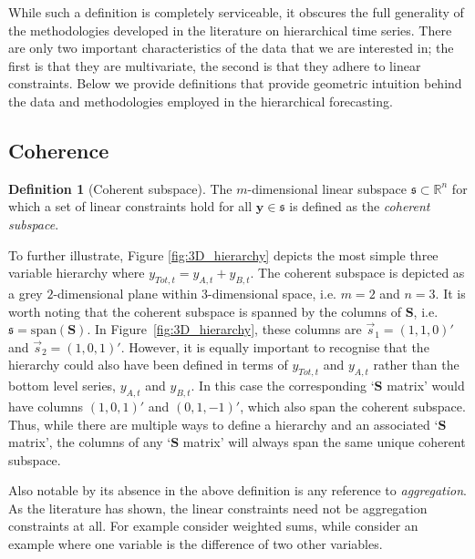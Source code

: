 \documentclass[12pt]{article}
\theoremstyle{definition}
\newtheorem{definition}{Definition}[section]
\begin{document}
	While such a definition is completely serviceable, it obscures the full generality of the methodologies developed in the literature on hierarchical time series.  There are only two important characteristics of the data that we are interested in; the first is that they are multivariate, the second is that they adhere to linear constraints.  Below we provide definitions that provide geometric intuition behind the data and methodologies employed in the hierarchical forecasting.
	
	
	\subsection{Coherence}\label{sec:cohpointf}
	
	 \begin{definition}[Coherent subspace]\label{def:cohspace}
	 	The $m$-dimensional linear subspace $\mathfrak{s}\subset \mathbb{R}^n$ for which a set of linear constraints hold for all $\bm{y}\in\mathfrak{s}$ is defined as the \emph{coherent subspace}.
	 \end{definition}
 
     To further illustrate, Figure \ref{fig:3D_hierarchy} depicts the most simple three variable hierarchy where $y_{Tot,t}=y_{A,t}+y_{B,t}$.  The coherent subspace is depicted as a grey $2$-dimensional plane within $3$-dimensional space, i.e. $m=2$ and $n=3$.  It is worth noting that the coherent subspace is spanned by the columns of $\bm{S}$, i.e.\ $\mathfrak{s}=\text{span}(\bm{S})$.  In Figure~\ref{fig:3D_hierarchy}, these columns are $\vec{s}_1=(1,1,0)'$ and $\vec{s}_2=(1,0,1)'$.  However, it is equally important to recognise that the hierarchy could also have been defined in terms of $y_{Tot,t}$ and $y_{A,t}$ rather than the bottom level series, $y_{A,t}$ and $y_{B,t}$. In this case the corresponding `$\bm{S}$ matrix' would have columns $(1,0,1)'$ and $(0,1,-1)'$, which also span the coherent subspace.  Thus, while there are multiple ways to define a hierarchy and an associated `$\bm{S}$ matrix', the columns of any `$\bm{S}$ matrix' will always span the same unique coherent subspace.
     
     Also notable by its absence in the above definition is any reference to {\em aggregation}.  As the literature has shown, the linear constraints need not be aggregation constraints at all. For example  consider weighted sums, while  consider an example where one variable is the difference of two other variables. 
     
\end{document}
